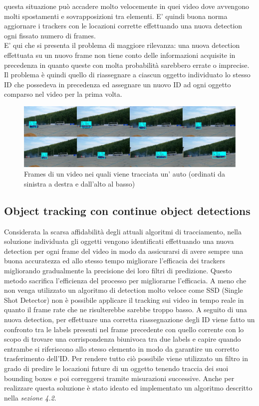 questa situazione può accadere molto velocemente in quei video dove avvengono molti spostamenti e sovrapposizioni tra elementi. E' quindi buona norma aggiornare i trackers con le locazioni corrette effettuando una nuova detection ogni fissato numero di frames.\\ E' qui che si presenta il problema di maggiore rilevanza: una nuova detection effettuata su un nuovo frame non tiene conto delle informazioni acquisite in precedenza in quanto queste con molta probabilità sarebbero errate o imprecise. Il problema è quindi quello di riassegnare a ciascun oggetto individuato lo stesso ID che possedeva in precedenza ed assegnare un nuovo ID ad ogni oggetto comparso nel video per la prima volta. 
\begin{figure}[H]
	\centering
	\includegraphics[width=1\linewidth]{images/esempio-tracking.jpg}
	\caption{Frames di un video nei quali viene tracciata un' auto (ordinati da sinistra a destra e dall'alto al basso)}
	\label{Esempio di un'immagine in alta risoluzione frammentata in regioni senza sovrapposizioni}
\end{figure}
\subsection{Object tracking con continue object detections}
Considerata la scarsa affidabilità degli attuali algoritmi di tracciamento, nella soluzione individuata gli oggetti vengono identificati effettuando una nuova detection per ogni frame del video in modo da assicurarsi di avere sempre una buona accuratezza ed allo stesso tempo migliorare l'efficacia dei trackers migliorando gradualmente la precisione dei loro filtri di predizione. Questo metodo sacrifica l'efficienza del processo per migliorarne l'efficacia. A meno che non venga utilizzato un algoritmo di detection molto veloce come SSD (Single Shot Detector) non è possibile applicare il tracking sui video in tempo reale in quanto il frame rate che ne risulterebbe sarebbe troppo basso. A seguito di una nuova detection, per effettuare una corretta riassegnazione degli ID viene fatto un confronto tra le labels presenti nel frame precedente con quello corrente con lo scopo di trovare una corrispondenza biunivoca tra due labels e capire quando entrambe si riferiscono allo stesso elemento in modo da garantire un corretto trasferimento dell'ID. Per rendere tutto ciò possibile viene utilizzato un filtro in grado di predire le locazioni future di un oggetto tenendo traccia dei suoi bounding boxes e poi correggersi tramite misurazioni successive. Anche per realizzare questa soluzione è stato ideato ed implementato un algoritmo descritto nella \textit{sezione 4.2}.
